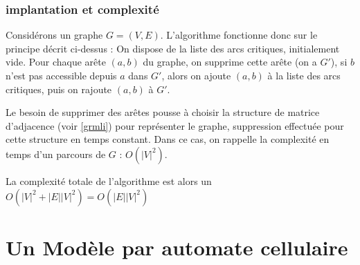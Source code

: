 \documentclass[11pt]{article}
\begin{document}
		\subsubsection{implantation et complexité}
	Considérons un graphe $G=(V,E)$. L'algorithme fonctionne donc sur le principe décrit ci-dessus : On dispose de la liste des arcs critiques, initialement vide. Pour chaque arête $(a,b)$ du graphe, on supprime cette arête (on a $G\prime$), si $b$ n'est pas accessible depuis $a$ dans $G\prime$, alors on ajoute $(a,b)$ à la liste des arcs critiques, puis on rajoute $(a,b)$ à $G\prime$.\par 
Le besoin de supprimer des arêtes pousse à choisir la structure de matrice d'adjacence (voir \ref{grmli}) pour représenter le graphe, suppression effectuée pour cette structure en temps constant. Dans ce cas, on rappelle la complexité en temps d'un parcours de $G$ : $O(|V|^2)$. \par 

La complexité totale de l'algorithme est alors un $O(|V|^2 + |E||V|^2) = O(|E||V|^2)$

\section{Un Modèle par automate cellulaire}
\end{document}
